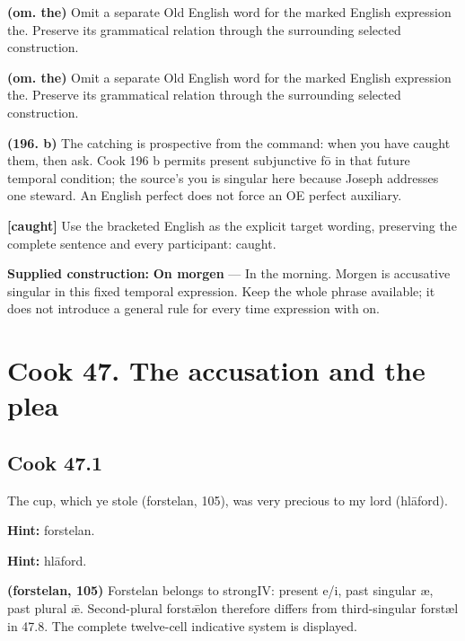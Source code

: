 \textbf{(om. the)} Omit a separate Old English word for the marked English expression the. Preserve its grammatical relation through the surrounding selected construction.

\textbf{(om. the)} Omit a separate Old English word for the marked English expression the. Preserve its grammatical relation through the surrounding selected construction.

\textbf{(196. b)} The catching is prospective from the command: when you have caught them, then ask. Cook 196 b permits present subjunctive fō in that future temporal condition; the source’s you is singular here because Joseph addresses one steward. An English perfect does not force an OE perfect auxiliary.

\textbf{[caught]} Use the bracketed English as the explicit target wording, preserving the complete sentence and every participant: caught.

\textbf{Supplied construction:} \textbf{On morgen} — In the morning. Morgen is accusative singular in this fixed temporal expression. Keep the whole phrase available; it does not introduce a general rule for every time expression with on.

\section*{Cook 47. The accusation and the plea}

\par\begin{minipage}{\linewidth}\raggedright
\subsection*{Cook 47.1}

The cup, which ye stole (forstelan, 105), was very precious to my lord (hlāford).

\textbf{Hint:} forstelan.

\textbf{Hint:} hlāford.

\textbf{(forstelan, 105)} Forstelan belongs to strongIV: present e/\allowbreak{}i, past singular æ, past plural ǣ. Second-plural forstǣlon therefore differs from third-singular forstæl in 47.8. The complete twelve-cell indicative system is displayed.

\end{minipage}\par\addvspace{4pt}

